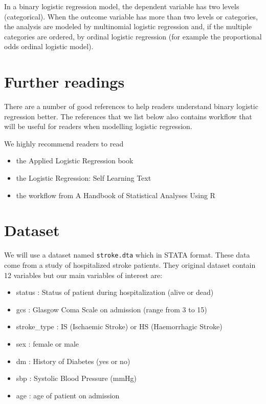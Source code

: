 \documentclass[
  10pt,
]{krantz}
\providecommand{\tightlist}{%
  \setlength{\itemsep}{0pt}\setlength{\parskip}{0pt}}
\begin{document}
In a binary logistic regression model, the dependent variable has two levels (categorical). When the outcome variable has more than two levels or categories, the analysis are modeled by multinomial logistic regression and, if the multiple categories are ordered, by ordinal logistic regression (for example the proportional odds ordinal logistic model).

\hypertarget{further-readings}{%
\section{Further readings}\label{further-readings}}

There are a number of good references to help readers understand binary logistic regression better. The references that we list below also contains workflow that will be useful for readers when modelling logistic regression.

We highly recommend readers to read

\begin{itemize}
\tightlist
\item
  the Applied Logistic Regression book \citep{hosmer2013applied}
\item
  the Logistic Regression: Self Learning Text \citep{kleinbaum2010logistic}
\item
  the workflow from A Handbook of Statistical Analyses Using R \citep{R-HSAUR}
\end{itemize}

\hypertarget{dataset-1}{%
\section{Dataset}\label{dataset-1}}

We will use a dataset named \texttt{stroke.dta} which in STATA format. These data come from a study of hospitalized stroke patients. They original dataset contain 12 variables but our main variables of interest are:

\begin{itemize}
\tightlist
\item
  status : Status of patient during hospitalization (alive or dead)
\item
  gcs : Glasgow Coma Scale on admission (range from 3 to 15)
\item
  stroke\_type : IS (Ischaemic Stroke) or HS (Haemorrhagic Stroke)
\item
  sex : female or male
\item
  dm : History of Diabetes (yes or no)
\item
  sbp : Systolic Blood Pressure (mmHg)
\item
  age : age of patient on admission
\end{itemize}
\end{document}
